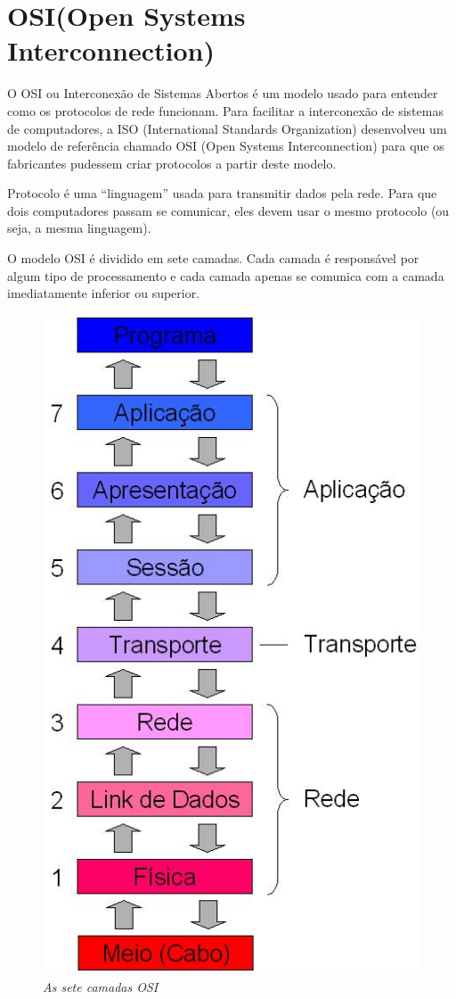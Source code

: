 \section{OSI(Open Systems Interconnection)}

O OSI  ou Interconexão de Sistemas Abertos é um modelo usado para entender como os protocolos de rede funcionam. Para facilitar a interconexão de sistemas de computadores, a ISO (International Standards Organization) desenvolveu um modelo de referência chamado OSI (Open Systems Interconnection) para que os fabricantes pudessem criar protocolos a partir deste modelo. \cite{TORRESOSI}

Protocolo é uma “linguagem” usada para transmitir dados pela rede. Para que dois computadores passam se comunicar, eles devem usar o mesmo protocolo (ou seja, a mesma linguagem).

O modelo OSI é dividido em sete camadas. Cada camada é responsável por algum tipo de processamento e cada camada apenas se comunica com a camada imediatamente inferior ou superior. \cite{VENTURAOSI}

\begin{figure}[h]
  \centering
  \includegraphics[scale=0.35]{img/camadas}
  \caption{\it As sete camadas OSI \cite{TORRESOSI}}
  \label{fig:CamadaOSI}
\end{figure}


